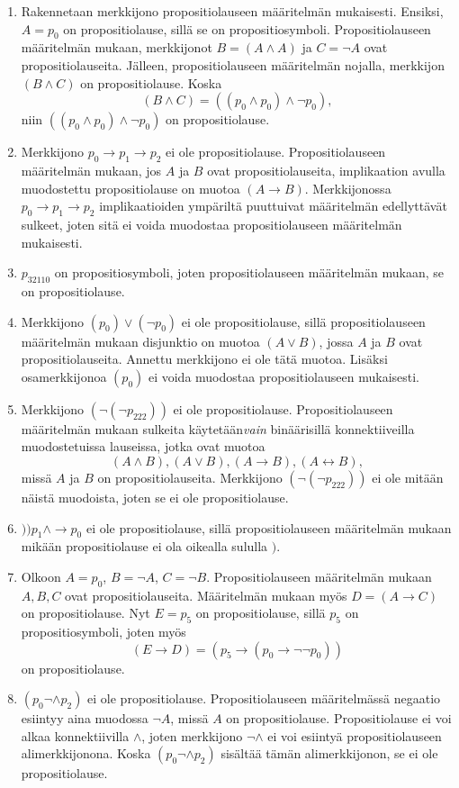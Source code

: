 \documentclass[12pt,a4paper]{article}
\begin{document}
\begin{solution}
\leavevmode\par
\begin{enumerate}[label=\alph*), nosep]
\item Rakennetaan merkkijono propositiolauseen määritelmän mukaisesti. Ensiksi,
\(A = p_0\) on propositiolause, sillä se on propositiosymboli.
Propositiolauseen määritelmän mukaan, merkkijonot
\(B = (A \land A)\) ja \(C = \neg A\) ovat propositiolauseita. Jälleen,
propositiolauseen määritelmän nojalla, merkkijon \((B \land C)\) on
propositiolause. Koska
\[(B \land C) = ((p_0 \land p_0) \land \neg p_0),\]
niin \(((p_0 \land p_0) \land \neg p_0)\) on propositiolause.
\item Merkkijono \(p_0 \rightarrow p_1 \rightarrow p_2\) ei ole propositiolause.
Propositiolauseen määritelmän mukaan, jos \(A\) ja \(B\) ovat
propositiolauseita, implikaation avulla muodostettu propositiolause on muotoa
\((A \rightarrow B)\). Merkkijonossa \(p_0 \rightarrow p_1 \rightarrow p_2\)
implikaatioiden ympäriltä puuttuivat määritelmän edellyttävät sulkeet, joten
sitä ei voida muodostaa propositiolauseen määritelmän mukaisesti.
\item \(p_{32110}\) on propositiosymboli, joten propositiolauseen määritelmän
mukaan, se on propositiolause.
\item Merkkijono \((p_0) \lor (\neg p_0)\) ei ole propositiolause, sillä
propositiolauseen määritelmän mukaan disjunktio on muotoa \((A \lor B)\),
jossa \(A\) ja \(B\) ovat propositiolauseita. Annettu merkkijono ei ole
tätä muotoa. Lisäksi osamerkkijonoa \((p_0)\) ei voida muodostaa
propositiolauseen mukaisesti.
\item Merkkijono \((\neg(\neg p_{222}))\) ei ole propositiolause.
Propositiolauseen määritelmän mukaan sulkeita käytetään\emph{vain}
binäärisillä konnektiiveilla muodostetuissa lauseissa, jotka ovat muotoa
\[(A \land B), (A \lor B), (A \rightarrow B), (A \leftrightarrow B),\]
missä \(A\) ja \(B\) on propositiolauseita. Merkkijono \((\neg(\neg p_{222}))\)
ei ole mitään näistä muodoista, joten se ei ole propositiolause.
\item \())p_1\land \rightarrow p_0\) ei ole propositiolause, sillä
propositiolauseen määritelmän mukaan mikään propositiolause ei ola
oikealla sululla \()\).
\item Olkoon \(A = p_0\), \(B = \neg A\), \(C = \neg B\). Propositiolauseen
määritelmän mukaan \(A,B,C\) ovat propositiolauseita. Määritelmän mukaan myös
\(D = (A \rightarrow C)\) on propositiolause. Nyt \(E = p_5\) on
propositiolause, sillä \(p_5\) on propositiosymboli, joten myös
\[(E \rightarrow D) = (p_5 \rightarrow (p_0 \rightarrow \neg \neg p_0))\]
on propositiolause.
\item \((p_0 \neg \land p_2)\) ei ole propositiolause. Propositiolauseen
määritelmässä negaatio esiintyy aina muodossa \(\neg A\), missä \(A\)
on propositiolause. Propositiolause ei voi alkaa konnektiivilla \(\land\),
joten merkkijono \(\neg \land\) ei voi esiintyä propositiolauseen
alimerkkijonona. Koska \((p_0 \neg \land p_2)\) sisältää tämän
alimerkkijonon, se ei ole propositiolause.
\end{enumerate}
\end{solution}
\end{document}
